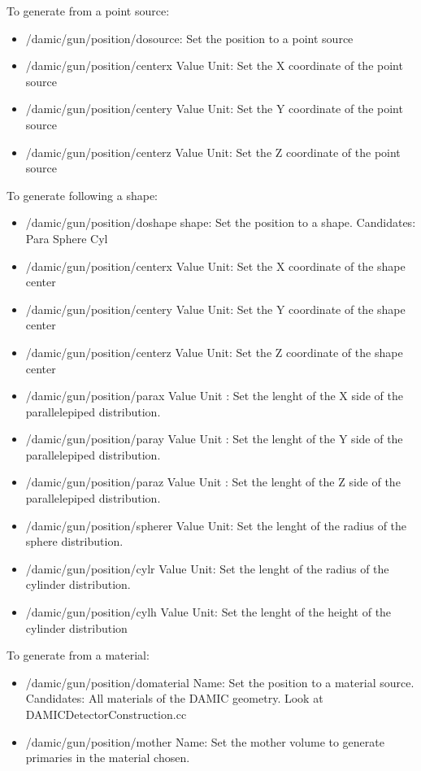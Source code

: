 \documentclass[français,final,twoside,12pt]{article}
\begin{document}
To generate from a point source: 

\begin{itemize}
\item /damic/gun/position/dosource: Set the position to a point source
\item /damic/gun/position/centerx Value Unit: Set the X coordinate of the point source 
\item /damic/gun/position/centery Value Unit: Set the Y coordinate of the point source 
\item /damic/gun/position/centerz Value Unit: Set the Z coordinate of the point source
\newline 
\end{itemize}

To generate following a shape:

\begin{itemize}
\item /damic/gun/position/doshape shape: Set the position to a shape. Candidates: Para Sphere Cyl
\item /damic/gun/position/centerx Value Unit: Set the X coordinate of the shape center
\item /damic/gun/position/centery Value Unit: Set the Y coordinate of the shape center 
\item /damic/gun/position/centerz Value Unit: Set the Z coordinate of the shape center
\item /damic/gun/position/parax Value Unit : Set the lenght of the X side of the parallelepiped distribution.
\item /damic/gun/position/paray Value Unit : Set the lenght of the Y side of the parallelepiped distribution.
\item /damic/gun/position/paraz Value Unit : Set the lenght of the Z side of the parallelepiped distribution.
\item /damic/gun/position/spherer Value Unit: Set the lenght of the radius of the sphere distribution.
\item /damic/gun/position/cylr Value Unit: Set the lenght of the radius of the cylinder distribution.
\item /damic/gun/position/cylh Value Unit: Set the lenght of the height of the cylinder distribution
\newline
\end{itemize}



To generate from a material: 

\begin{itemize}
\item /damic/gun/position/domaterial Name: Set the position to a material source. Candidates: All materials of the DAMIC geometry. Look at DAMICDetectorConstruction.cc
\item /damic/gun/position/mother Name: Set the mother volume to generate primaries in the material chosen.
\newline 
\end{itemize}
\end{document}
